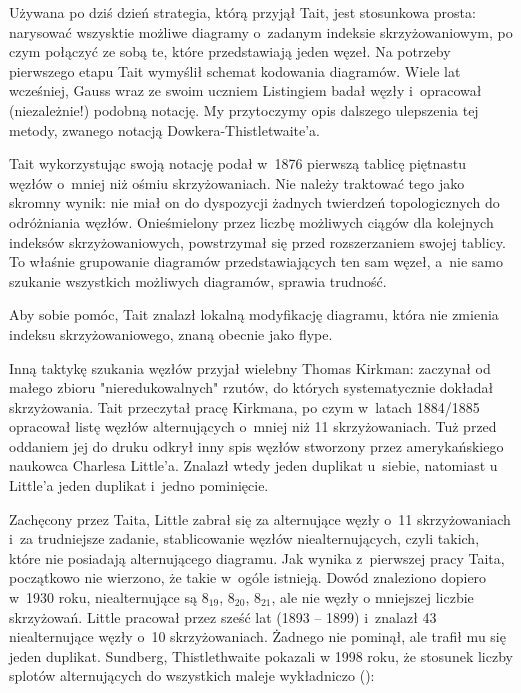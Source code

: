 {Używana po dziś dzień strategia, którą przyjął Tait, jest stosunkowa prosta: narysować wszysktie możliwe diagramy o~zadanym indeksie skrzyżowaniowym, po czym połączyć ze sobą te, które przedstawiają jeden węzeł.
Na potrzeby pierwszego etapu Tait wymyślił schemat kodowania diagramów.
Wiele lat wcześniej, Gauss wraz ze swoim uczniem Listingiem badał węzły i~opracował (niezależnie!) podobną notację.
My przytoczymy opis dalszego ulepszenia tej metody, zwanego notacją Dowkera-Thistletwaite’a.

Tait wykorzystując swoją notację podał w~1876 pierwszą tablicę piętnastu węzłów o~mniej niż ośmiu skrzyżowaniach.
Nie należy traktować tego jako skromny wynik: nie miał on do dyspozycji żadnych twierdzeń topologicznych do odróżniania węzłów.
Onieśmielony przez liczbę możliwych ciągów dla kolejnych indeksów skrzyżowaniowych, powstrzymał się przed rozszerzaniem swojej tablicy.
To właśnie grupowanie diagramów przedstawiających ten sam węzeł, a~nie samo szukanie wszystkich możliwych diagramów, sprawia trudność.

Aby sobie pomóc, Tait znalazł lokalną modyfikację diagramu, która nie zmienia indeksu skrzyżowaniowego, znaną obecnie jako flype.


Inną taktykę szukania węzłów przyjał wielebny Thomas Kirkman: zaczynał od małego zbioru "nieredukowalnych" rzutów, do których systematycznie dokładał skrzyżowania.
Tait przeczytał pracę Kirkmana, po czym w~latach 1884/1885 opracował listę węzłów alternujących o~mniej niż 11 skrzyżowaniach.
Tuż przed oddaniem jej do druku odkrył inny spis węzłów stworzony przez amerykańskiego naukowca Charlesa Little'a.
Znalazł wtedy jeden duplikat u~siebie, natomiast u Little'a jeden duplikat i~jedno pominięcie.

Zachęcony przez Taita, Little zabrał się za alternujące węzły o~11 skrzyżowaniach i~za trudniejsze zadanie, stablicowanie węzłów niealternujących, czyli takich, które nie posiadają alternującego diagramu.
Jak wynika z~pierwszej pracy Taita, początkowo nie wierzono, że takie w~ogóle istnieją.
Dowód znaleziono dopiero w~1930 roku, niealternujące są $8_{19}$, $8_{20}$, $8_{21}$, ale nie węzły o mniejszej liczbie skrzyżowań.
Little pracował przez sześć lat (1893 -- 1899) i~znalazł 43 niealternujące węzły o~10 skrzyżowaniach.
Żadnego nie pominął, ale trafił mu się jeden duplikat.
Sundberg, Thistlethwaite pokazali w 1998 roku, że stosunek liczby splotów alternujących do wszystkich maleje wykładniczo (\cite{sundberg98}):

}
